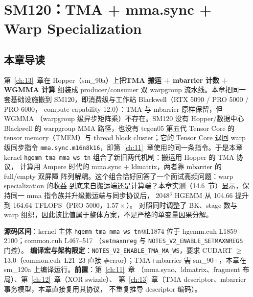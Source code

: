 \providecommand{\url}[1]{\texttt{#1}}
\chapter{SM120：TMA + mma.sync + Warp Specialization}\label{ch:14}

\section{本章导读}

第~\ref{ch:13}~章在 Hopper（sm\_90a）上把\textbf{TMA 搬运 + mbarrier 计数 + WGMMA 计算}
组装成 producer/consumer 双 warpgroup 流水线。本章把同一套基础设施搬到
SM120，即消费级与工作站 Blackwell（RTX 5090 / PRO 5000 / PRO 6000，
compute capability 12.0）：TMA 与 mbarrier 原样保留，但 WGMMA
（warpgroup 级异步矩阵乘）不存在。SM120 没有 Hopper/数据中心 Blackwell 的
warpgroup MMA 路径，也没有 tcgen05 第五代 Tensor Core 的 tensor memory（TMEM）与
thread block cluster；它的 Tensor Core 退回 warp 级同步指令
\texttt{mma.\allowbreak{}sync.\allowbreak{}m16n8k16}，即第~\ref{ch:11}~章使用的同一条指令。于是本章 kernel
\texttt{hgemm\_\allowbreak{}tma\_\allowbreak{}mma\_\allowbreak{}ws\_\allowbreak{}tn} 组合了新旧两代机制：搬运用 Hopper 的 TMA 协议，
计算用 Ampere 时代的 mma.sync + ldmatrix，两者靠 mbarrier 的 full/empty 双屏障
阵列解耦。这个组合恰好回答了一个面试高频问题：warp specialization 的收益
到底来自搬运端还是计算端？本章实测（14.6~节）显示，保持同一 mma 指令族并升级搬运端与同步协议后，
2048$^3$ HGEMM 从 104.66 提升到 164.64 TFLOPS（PRO 5000，$1.57\times$）。
对照同时调整了 BK、stage 数与 warp 组织，因此该比值属于整体方案，不是严格的单变量因果分解。

\textbf{源码区间}：kernel 主体 \texttt{hgemm\_\allowbreak{}tma\_\allowbreak{}mma\_\allowbreak{}ws\_\allowbreak{}tn}@L1874 位于
hgemm.cuh L1859--2100；common.cuh L467--517
（\texttt{setmaxnreg} 与 \texttt{NOTES\_\allowbreak{}V2\_\allowbreak{}ENABLE\_\allowbreak{}SETMAXNREGS} 门控）。
\textbf{编译宏与架构限定}：\texttt{NOTES\_\allowbreak{}V2\_\allowbreak{}ENABLE\_\allowbreak{}TMA\_\allowbreak{}MA\_\allowbreak{}WS}，要求
CUDART $\ge$ 13.0（common.cuh~L21--23 直接 \#error）；TMA+mbarrier 需
sm\_90+，本章在 sm\_120a 上编译运行。\textbf{前置}：第~\ref{ch:11}~章
（mma.sync、ldmatrix、fragment 布局）、第~\ref{ch:12}~章（XOR swizzle）、
第~\ref{ch:13}~章（TMA descriptor、mbarrier 事务模型，本章直接复用其协议，
不重复推导 descriptor 编码）。

